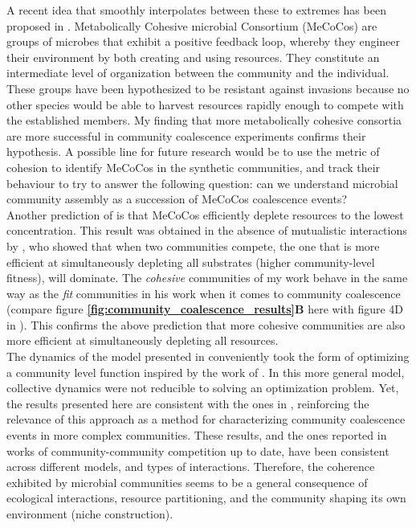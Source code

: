 \documentclass[titlepage,11pt]{article}
\begin{document}
\begin{linenumbers}
\begin{singlespace}
			A recent idea that smoothly interpolates between these to extremes has been proposed in \citep{Pascual-Garcia2020}. Metabolically Cohesive microbial Consortium (MeCoCos) are groups of microbes that exhibit a positive feedback loop, whereby they engineer their environment by both creating and using resources. They constitute an intermediate level of organization between the community and the individual. These groups have been hypothesized to be resistant against invasions because no other species would be able to harvest resources rapidly enough to compete with the established members. My finding that more metabolically cohesive consortia are more successful in community coalescence experiments confirms their hypothesis. A possible line for future research would be to use the metric of cohesion to identify MeCoCos in the synthetic communities, and track their behaviour to try to answer the following question:  can we understand microbial community assembly as a succession of MeCoCos coalescence events?\\ 
			Another prediction of \citet{Pascual-Garcia2020} is that MeCoCos efficiently deplete resources to the lowest concentration. This result was obtained in the absence of mutualistic interactions by \citet{Tikhonov2016}, who showed that when two communities compete, the one that is more efficient at simultaneously depleting all substrates (higher community-level fitness), will dominate.  The \textit{cohesive} communities of my work behave in the same way as the \textit{fit} communities in his work when it comes to community coalescence (compare figure \textbf{\ref{fig:community_coalescence_results}B} here with figure 4D in \citet{Tikhonov2016}). This confirms the above prediction that more cohesive communities are also more efficient at simultaneously depleting all resources.\\
			The dynamics of the model presented in \citet{Tikhonov2016} conveniently took the form of optimizing a community level function inspired by the work of \citet{Arthur1969}. In this more general model, collective dynamics were not reducible to solving an optimization problem. Yet, the results presented here are consistent with the ones in \citet{Tikhonov2016}, reinforcing the relevance of this approach as a method for characterizing community coalescence events in more complex communities. These results, and the ones reported in works of community-community competition up to date, have been consistent across different models, and types of interactions. Therefore, the coherence exhibited by microbial communities seems to be a general consequence of ecological interactions, resource partitioning, and the community shaping its own environment (niche construction).\\

\end{singlespace}
\end{linenumbers}
\end{document}
